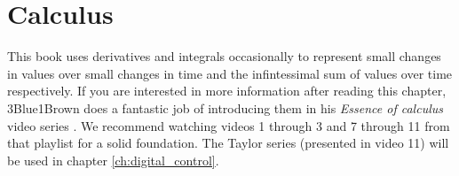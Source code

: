 
\chapter{Calculus}

This book uses derivatives and integrals occasionally to represent small changes
in values over small changes in time and the infintessimal sum of values over
time respectively. If you are interested in more information after reading this
chapter, 3Blue1Brown does a fantastic job of introducing them in his
\textit{Essence of calculus} video series \cite{bib:essence_of_calculus}. We
recommend watching videos 1 through 3 and 7 through 11 from that playlist for a
solid foundation. The Taylor series (presented in video 11) will be used in
chapter \ref{ch:digital_control}.

\renewcommand*{\chapterpath}{\partpath/calculus}



